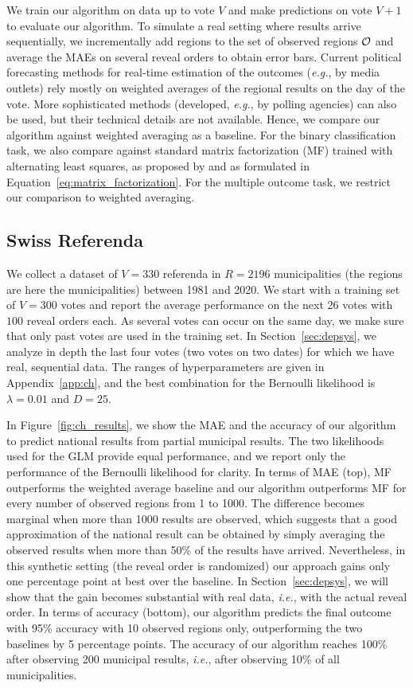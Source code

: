 We train our algorithm on data up to vote $V$ and make predictions on vote $V+1$ to evaluate our algorithm.
To simulate a real setting where results arrive sequentially, we incrementally add regions to the set of observed regions $\mathcal{O}$ and average the MAEs on several reveal orders to obtain error bars.
Current political forecasting methods for real-time estimation of the outcomes (\textit{e.g.}, by media outlets) rely mostly on weighted averages of the regional results on the day of the vote.
More sophisticated methods (developed, \textit{e.g.}, by polling agencies) can also be used, but their technical details are not available.
Hence, we compare our algorithm against weighted averaging as a baseline.
For the binary classification task, we also compare against standard matrix factorization (MF) trained with alternating least squares, as proposed by \citet{etter2016online} and as formulated in Equation~\eqref{eq:matrix_factorization}.
For the multiple outcome task, we restrict our comparison to weighted averaging.

\subsection{Swiss Referenda}
\label{sec:swiss_referenda}

We collect a dataset of $V=330$ referenda in $R=2196$ municipalities (the regions are here the municipalities) between 1981 and 2020.
We start with a training set of $V=300$ votes and report the average performance on the next 26 votes with $100$ reveal orders each.
As several votes can occur on the same day, we make sure that only past votes are used in the training set.
In Section~\ref{sec:depsys}, we analyze in depth the last four votes (two votes on two dates) for which we have real, sequential data.
The ranges of hyperparameters are given in Appendix~\ref{app:ch}, and the best combination for the Bernoulli likelihood is $\lambda = 0.01 $ and $D = 25$.

In Figure~\ref{fig:ch_results}, we show the MAE and the accuracy of our algorithm to predict national results from partial municipal results.
The two likelihoods used for the GLM provide equal performance, and we report only the performance of the Bernoulli likelihood for clarity.
In terms of MAE (top), MF outperforms the weighted average baseline and our algorithm outperforms MF for every number of observed regions from 1 to 1000.
The difference becomes marginal when more than 1000 results are observed, which suggests that a good approximation of the national result can be obtained by simply averaging the observed results when more than 50\% of the results have arrived.
Nevertheless, in this synthetic setting (the reveal order is randomized) our approach gains only one percentage point at best over the baseline.
In Section~\ref{sec:depsys}, we will show that the gain becomes substantial with real data, \textit{i.e.}, with the actual reveal order.
In terms of accuracy (bottom), our algorithm predicts the final outcome with 95\% accuracy with 10 observed regions only, outperforming the two baselines by 5 percentage points.
The accuracy of our algorithm reaches 100\% after observing 200 municipal results, \textit{i.e.}, after observing 10\% of all municipalities.

